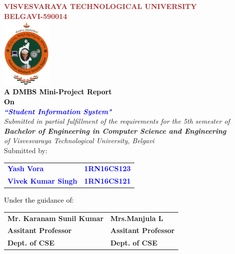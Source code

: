 
\begin{titlepage}
\begin{center}
\break\break
\textup{\large {\textcolor{brown}{\bf VISVESVARAYA TECHNOLOGICAL UNIVERSITY} \\ {\textcolor{brown}{\bf BELGAVI-590014}}}}\\[0.1in]
\includegraphics[width=0.18\textwidth]{./VTU.png}\\[0.1in]
\textup{\small {\textcolor{black}{\textbf {A DMBS Mini-Project Report} \\ {\textbf {On}}}}} \\[0.2in]
\textup{\large {\textcolor{blue}{\textbf {\textit {``Student Information System"}}}}} \\[0.2in]
\textup{{\textit {Submitted in partial fulfillment of the requirements for the 5th semester of} \\ {\textbf {\textit {Bachelor of Engineering in Computer Science and Engineering}} \\ \textit {of Visvesvaraya Technological University, Belgavi}}}}\\[0.15in]
\textup{Submitted by:} 
\break\break
\begin{tabular}{l  l}
\textcolor{blue}{\textbf{Yash Vora}} & \textcolor{blue}{\hspace{2.7cm}\textbf{1RN16CS123}}\\[0.3in]
\textcolor{blue}{\textbf{Vivek Kumar Singh}} & \textcolor{blue}{\hspace{2.7cm}\textbf{1RN16CS121}}\\
\end{tabular}
\break\break\break\break
\textup{\normalsize {\textcolor{black}{ Under the guidance of:}}}\break\break
\begin{tabular}{l  l}
\textbf{Mr. Karanam Sunil Kumar} & \hspace{2.7cm}\textbf{Mrs.Manjula L}\\
\textbf{Assitant Professor} & \hspace{2.7cm}\textbf{Assitant Professor}\\
\textbf{Dept. of CSE} & \hspace{2.7cm}\textbf{Dept. of CSE}\\
\end{tabular}


\end{center}
\end{titlepage}
